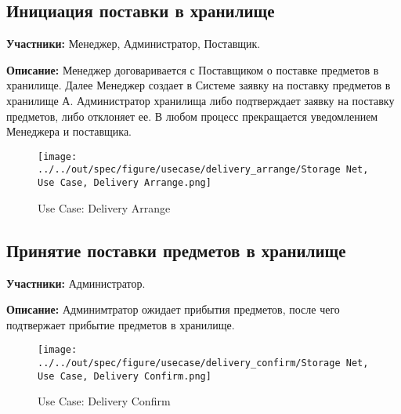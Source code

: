 \subsection{Инициация поставки в хранилище}

\textbf{Участники:}
Менеджер, Администратор, Поставщик.

\textbf{Описание:}
Менеджер договаривается с Поставщиком о
поставке предметов в хранилище. Далее Менеджер 
создает в Системе заявку на поставку предметов в 
хранилище А. Администратор хранилища либо подтверждает 
заявку на поставку предметов, либо отклоняет ее. В 
любом процесс прекращается уведомлением Менеджера и 
поставщика.

\begin{figure}[h]
  \centering
  \texttt{[image: ../../out/spec/figure/usecase/delivery\_arrange/Storage Net, Use Case, Delivery Arrange.png]}
  \caption{Use Case: Delivery Arrange}
\end{figure}


\subsection{Принятие поставки предметов в хранилище}

\textbf{Участники:}
Администратор.

\textbf{Описание:}
Админимтратор ожидает прибытия предметов, после 
чего подтвержает прибытие предметов в хранилище.

\begin{figure}[h]
  \centering
  \texttt{[image: ../../out/spec/figure/usecase/delivery\_confirm/Storage Net, Use Case, Delivery Confirm.png]}
  \caption{Use Case: Delivery Confirm}
\end{figure}
